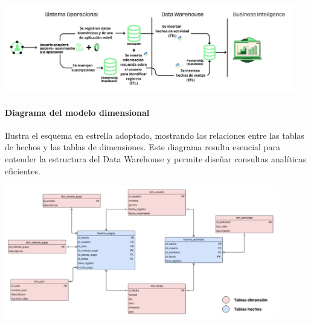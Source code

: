 \includegraphics[width=0.95\textwidth]{img/flujo_datos.png}

\paragraph{Diagrama del modelo dimensional} Ilustra el esquema en estrella adoptado, mostrando las relaciones entre las tablas de hechos y las tablas de dimensiones. Este diagrama resulta esencial para entender la estructura del Data Warehouse y permite diseñar consultas analíticas eficientes.

\includegraphics[width=0.9\textwidth]{img/modelo_dimensional.png}

